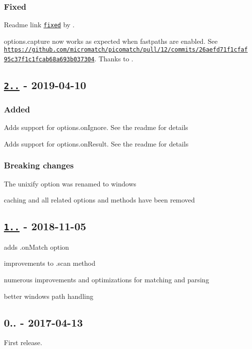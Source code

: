 \subsubsection*{Fixed}


\begin{DoxyItemize}
\item Readme link \href{https://github.com/micromatch/picomatch/pull/13/commits/a96ab3aa2b11b6861c23289964613d85563b05df}{\tt fixed} by .
\item {\ttfamily options.\+capture} now works as expected when fastpaths are enabled. See \href{https://github.com/micromatch/picomatch/pull/12/commits/26aefd71f1cfaf95c37f1c1fcab68a693b037304}{\tt https\+://github.\+com/micromatch/picomatch/pull/12/commits/26aefd71f1cfaf95c37f1c1fcab68a693b037304}. Thanks to .
\end{DoxyItemize}

\subsection*{\href{https://github.com/jonschlinkert/micromatch/compare/1.0.0...2.0.0}{\tt 2..} -\/ 2019-\/04-\/10}

\subsubsection*{Added}


\begin{DoxyItemize}
\item Adds support for {\ttfamily options.\+on\+Ignore}. See the readme for details
\item Adds support for {\ttfamily options.\+on\+Result}. See the readme for details
\end{DoxyItemize}

\subsubsection*{Breaking changes}


\begin{DoxyItemize}
\item The unixify option was renamed to {\ttfamily windows}
\item caching and all related options and methods have been removed
\end{DoxyItemize}

\subsection*{\href{https://github.com/jonschlinkert/micromatch/compare/0.1.0...1.0.0}{\tt 1..} -\/ 2018-\/11-\/05}


\begin{DoxyItemize}
\item adds {\ttfamily .on\+Match} option
\item improvements to {\ttfamily .scan} method
\item numerous improvements and optimizations for matching and parsing
\item better windows path handling
\end{DoxyItemize}

\subsection*{0.. -\/ 2017-\/04-\/13}

First release. 